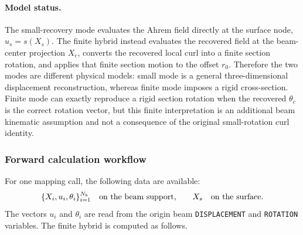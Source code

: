 \documentclass[11pt,a4paper]{article}
\begin{document}
\paragraph{Model status.}
The small-recovery mode evaluates the Ahrem field directly at the surface
node, \(u_s=s(X_s)\).  The finite hybrid instead evaluates the recovered field
at the beam-center projection \(X_c\), converts the recovered local curl into
a finite section rotation, and applies that finite section motion to the
offset \(r_0\).  Therefore the two modes are different physical models:
small mode is a general three-dimensional displacement reconstruction,
whereas finite mode imposes a rigid cross-section.  Finite mode can exactly
reproduce a rigid section rotation when the recovered \(\theta_c\) is the
correct rotation vector, but this finite interpretation is an additional beam
kinematic assumption and not a consequence of the original small-rotation
curl identity.

\subsubsection{Forward calculation workflow}

For one mapping call, the following data are available:
\[
  \{X_i,u_i,\theta_i\}_{i=1}^{N_b}
  \quad\hbox{on the beam support,}
  \qquad
  X_s
  \quad\hbox{on the surface.}
\]
The vectors \(u_i\) and \(\theta_i\) are read from the origin beam
\texttt{DISPLACEMENT} and \texttt{ROTATION} variables.  The finite hybrid is
computed as follows.
\end{document}
